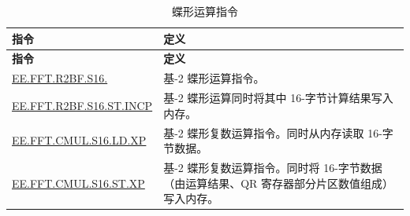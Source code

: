 \begin{longtable}[c]{|l|m{10cm}|}
    \caption{蝶形运算指令}
    \label{tab:pie-butterfly-instructions}\\
    \hline
    \rowcolor{lightgray}
    \textbf{指令} & \textbf{定义} \\\hline
    \endfirsthead
    \rowcolor{lightgray}
    \textbf{指令} & \textbf{定义} \\\hline
    \endhead
    \endfoot
    
    \hyperref[instruction:EEFFTR2BFS16]{EE.FFT.R2BF.S16.} & 基-2 蝶形运算指令。
    \\\hline
    \hyperref[instruction:EEFFTR2BFS16STINCP]{EE.FFT.R2BF.S16.ST.INCP} & 基-2 蝶形运算同时将其中 16-字节计算结果写入内存。
    \\\hline
    \hyperref[instruction:EEFFTCMULS16LDXP]{EE.FFT.CMUL.S16.LD.XP} & 基-2 蝶形复数运算指令。同时从内存读取 16-字节数据。
    \\\hline
    \hyperref[instruction:EEFFTCMULS16STXP]{EE.FFT.CMUL.S16.ST.XP} & 基-2 蝶形复数运算指令。同时将 16-字节数据（由运算结果、QR 寄存器部分片区数值组成）写入内存。
    \\\hline
\end{longtable}